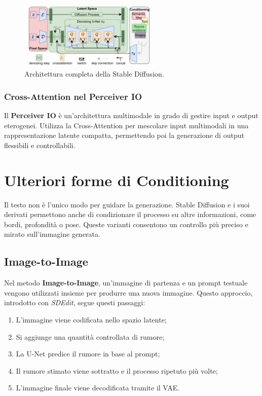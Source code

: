 \begin{figure}
    \centering
    \includegraphics[width=0.6\textwidth]{figure/StableDiffusionArchitecture.png}
    \caption{Architettura completa della Stable Diffusion.}
    \label{fig:StabDiffArch}
\end{figure}

\subsubsection{Cross-Attention nel Perceiver IO}

Il \textbf{Perceiver IO} è un'architettura multimodale in grado di gestire input e output eterogenei. Utilizza la Cross-Attention per mescolare input multimodali in una rappresentazione latente compatta, permettendo poi la generazione di output flessibili e controllabili.

\section{Ulteriori forme di Conditioning}
Il testo non è l’unico modo per guidare la generazione. Stable Diffusion e i suoi derivati permettono anche di condizionare il processo su altre informazioni, come bordi, profondità o pose. Queste varianti consentono un controllo più preciso e mirato sull’immagine generata.

\subsection{Image-to-Image}
Nel metodo \textbf{Image-to-Image}, un’immagine di partenza e un prompt testuale vengono utilizzati insieme per produrre una nuova immagine. Questo approccio, introdotto con \textit{SDEdit}, segue questi passaggi:

\begin{enumerate}
    \item L’immagine viene codificata nello spazio latente;
    \item Si aggiunge una quantità controllata di rumore;
    \item La U-Net predice il rumore in base al prompt;
    \item Il rumore stimato viene sottratto e il processo ripetuto più volte;
    \item L’immagine finale viene decodificata tramite il VAE.
\end{enumerate}


